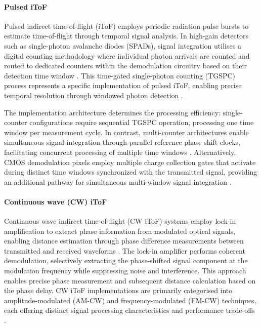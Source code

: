 \documentclass[12pt,a4paper,oneside]{report}
\begin{document}
\paragraph{Pulsed iToF}
\label{par:pulsed_itof}

Pulsed indirect time-of-flight (iToF) employs periodic radiation pulse bursts to estimate time-of-flight through temporal signal analysis. In high-gain detectors such as single-photon avalanche diodes (SPADs), signal integration utilises a digital counting methodology where individual photon arrivals are counted and routed to dedicated counters within the demodulation circuitry based on their detection time window \cite{piron2020}. This time-gated single-photon counting (TGSPC) process represents a specific implementation of pulsed iToF, enabling precise temporal resolution through windowed photon detection \cite{bamji2022}.

The implementation architecture determines the processing efficiency: single-counter configurations require sequential TGSPC operation, processing one time window per measurement cycle. In contrast, multi-counter architectures enable simultaneous signal integration through parallel reference phase-shift clocks, facilitating concurrent processing of multiple time windows \cite{bamji2022}. Alternatively, CMOS demodulation pixels employ multiple charge collection gates that activate during distinct time windows synchronized with the transmitted signal, providing an additional pathway for simultaneous multi-window signal integration \cite{bamji2022}.

\paragraph{Continuous wave (CW) iToF}
\label{par:continuous_wave_itof}

Continuous wave indirect time-of-flight (CW iToF) systems employ lock-in amplification to extract phase information from modulated optical signals, enabling distance estimation through phase difference measurements between transmitted and received waveforms \cite{bamji2022}. The lock-in amplifier performs coherent demodulation, selectively extracting the phase-shifted signal component at the modulation frequency while suppressing noise and interference. This approach enables precise phase measurement and subsequent distance calculation based on the phase delay. CW iToF implementations are primarily categorised into amplitude-modulated (AM-CW) and frequency-modulated (FM-CW) techniques, each offering distinct signal processing characteristics and performance trade-offs \cite{bamji2022}.
\end{document}

